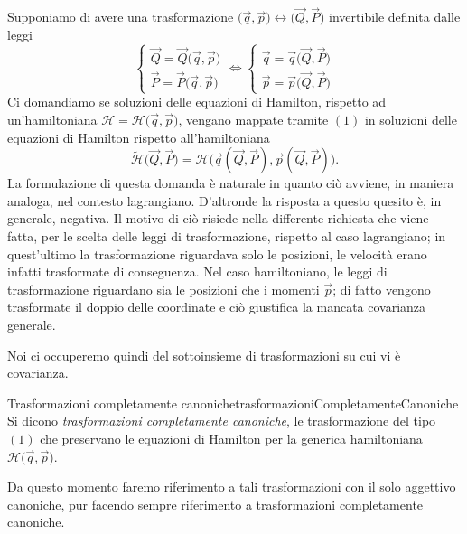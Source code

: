 Supponiamo di avere una trasformazione \(\big(\vec{q},\vec{p}\big) \longleftrightarrow \big(\vec{Q},\vec{P}\big)\) invertibile definita dalle leggi
\[
	\begin{cases}
		\vec{Q} = \vec{Q}\big(\vec{q},\vec{p}\big) \\
		\vec{P} = \vec{P}\big(\vec{q},\vec{p}\big)
	\end{cases} \iff
	\begin{cases}
		\vec{q} = \vec{q}\big(\vec{Q},\vec{P}\big) \\
		\vec{p} = \vec{p}\big(\vec{Q},\vec{P}\big)
	\end{cases}\tag{\(1\)}
\]
Ci domandiamo se soluzioni delle equazioni di Hamilton, rispetto ad un'hamiltoniana \(\mathcal{H}=\mathcal{H}\big(\vec{q},\vec{p}\big)\), vengano mappate tramite \((1)\) in soluzioni delle equazioni di Hamilton rispetto all'hamiltoniana
\[
	\tilde{\mathcal{H}}\big(\vec{Q},\vec{P}\big) = \mathcal{H}\big(\vec{q}(\vec{Q},\vec{P}),\vec{p}(\vec{Q},\vec{P})\big).
\]
La formulazione di questa domanda è naturale in quanto ciò avviene, in maniera analoga, nel contesto lagrangiano.
D'altronde la risposta a questo quesito è, in generale, negativa.
Il motivo di ciò risiede nella differente richiesta che viene fatta, per le scelta delle leggi di trasformazione, rispetto al caso lagrangiano; in quest'ultimo la trasformazione riguardava solo le posizioni, le velocità erano infatti trasformate di conseguenza. Nel caso hamiltoniano, le leggi di trasformazione riguardano sia le posizioni che i momenti \(\vec{p}\); di fatto vengono trasformate il doppio delle coordinate e ciò giustifica la mancata covarianza generale.

Noi ci occuperemo quindi del sottoinsieme di trasformazioni su cui vi è covarianza.

\begin{defn}{Trasformazioni completamente canoniche}{trasformazioniCompletamenteCanoniche}
	Si dicono \emph{trasformazioni completamente canoniche}, le trasformazione del tipo \((1)\) che preservano le equazioni di Hamilton per la generica hamiltoniana \(\mathcal{H}\big(\vec{q},\vec{p}\big)\).
\end{defn}

\begin{notz}
	Da questo momento faremo riferimento a tali trasformazioni con il solo aggettivo canoniche, pur facendo sempre riferimento a trasformazioni completamente canoniche.
\end{notz}


